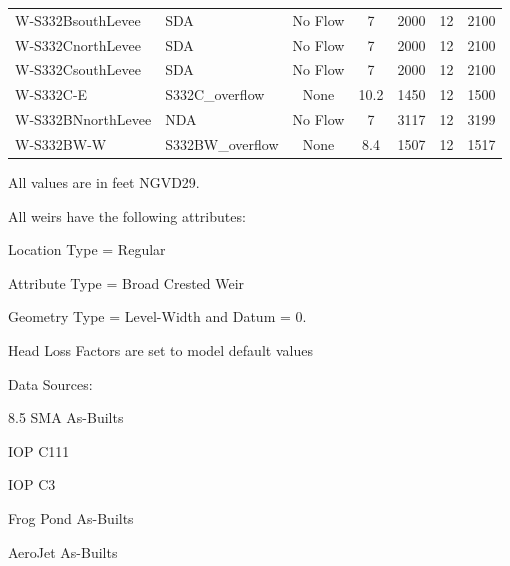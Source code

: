 \begin{table}[!h]
\begin{tabular}{llccccc}
W-S332BsouthLevee & SDA              & No Flow   &  7      & 2000    & 12    & 2100  \\
W-S332CnorthLevee & SDA              & No Flow   &  7      & 2000    & 12    & 2100  \\
W-S332CsouthLevee & SDA              & No Flow   &  7      & 2000    & 12    & 2100  \\
W-S332C-E         & S332C\_overflow  & None      &  10.2   & 1450    & 12    & 1500  \\
W-S332BNnorthLevee& NDA              & No Flow   &  7      & 3117    & 12    & 3199  \\
W-S332BW-W        & S332BW\_overflow & None      &  8.4    & 1507    & 12    & 1517  \\
\hline
\end{tabular}

All values are in feet NGVD29.


All weirs have the following attributes:
\begin{packed_items}
\item Location Type = Regular
\item Attribute Type = Broad Crested Weir
\item Geometry Type = Level-Width and Datum = 0.
\item Head Loss Factors are set to model default values
\end{packed_items}

Data Sources:
\begin{packed_items}
\item 8.5 SMA As-Builts
\item IOP C111
\item IOP C3
\item Frog Pond As-Builts
\item AeroJet As-Builts
\end{packed_items}

\end{table}

\clearpage

